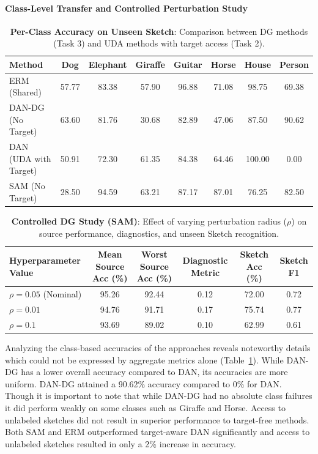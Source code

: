 \documentclass{article}
\begin{document}
\paragraph{Class-Level Transfer and Controlled Perturbation Study}
\begin{table}[H]
    \centering
    \caption{\textbf{Per-Class Accuracy on Unseen Sketch}: Comparison between DG methods (Task 3) and UDA methods with target access (Task 2).}
    \label{tab:task3_per_class}
    \begin{tabular}{lccccccc}
        \toprule
        \textbf{Method} & \textbf{Dog} & \textbf{Elephant} & \textbf{Giraffe} & \textbf{Guitar} & \textbf{Horse} & \textbf{House} & \textbf{Person} \\
        \midrule
        ERM (Shared) & 57.77 & 83.38 & 57.90 & 96.88 & 71.08 & 98.75 & 69.38 \\
        DAN-DG (No Target) & 63.60 & 81.76 & 30.68 & 82.89 & 47.06 & 87.50 & 90.62 \\
        DAN (UDA with Target) & 50.91 & 72.30 & 61.35 & 84.38 & 64.46 & 100.00 & 0.00 \\
        SAM (No Target) & 28.50 & 94.59 & 63.21 & 87.17 & 87.01 & 76.25 & 82.50 \\
        \bottomrule
    \end{tabular}
\end{table}

\begin{table}[H]
    \centering
    \caption{\textbf{Controlled DG Study (SAM)}: Effect of varying perturbation radius ($\rho$) on source performance, diagnostics, and unseen Sketch recognition.}
    \label{tab:task3_design_study}
    \begin{tabular}{lccccc}
        \toprule
        \textbf{Hyperparameter Value} & \textbf{Mean Source Acc (\%)} & \textbf{Worst Source Acc (\%)} & \textbf{Diagnostic Metric} & \textbf{Sketch Acc (\%)} & \textbf{Sketch F1} \\
        \midrule
        $\rho = 0.05$ (Nominal) & 95.26 & 92.44 & 0.12 & 72.00 & 0.72 \\
        $\rho = 0.01$ & 94.76 & 91.71 & 0.17 & 75.74 & 0.77 \\
        $\rho = 0.1$ & 93.69 & 89.02 & 0.10 & 62.99 & 0.61 \\
        \bottomrule
    \end{tabular}
\end{table}
Analyzing the class-based accuracies of the approaches reveals noteworthy details which could not be expressed by aggregate metrics alone (Table~\ref{tab:task3_per_class}). While DAN-DG has a lower overall accuracy compared to DAN, its accuracies are more uniform. DAN-DG attained a 90.62\% accuracy compared to 0\% for DAN. Though it is important to note that while DAN-DG had no absolute class failures it did perform weakly on some classes such as Giraffe and Horse. Access to unlabeled sketches did not result in superior performance to target-free methods. Both SAM and ERM outperformed target-aware DAN significantly and access to unlabeled sketches resulted in only a 2\% increase in accuracy.
\end{document}
